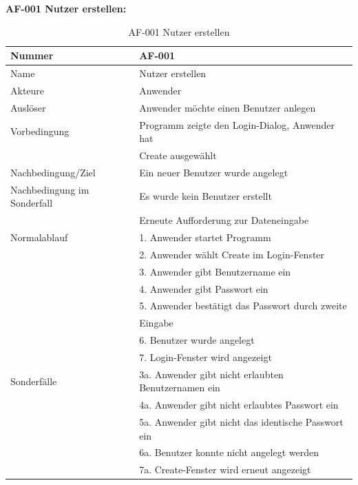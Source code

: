 \documentclass[12pt,a4paper,bibliography=totocnumbered,listof=totocnumbered]{scrartcl}
\begin{document}
\textbf{AF-001 Nutzer erstellen:}
\begin{table}[!h]
	\centering
	\begin{tabular}{|l|l|}
		\hline
		Nummer & AF-001\\
		\hline
		Name & Nutzer erstellen\\
		\hline
		Akteure & Anwender\\
		\hline
		Auslöser & Anwender möchte einen Benutzer anlegen\\
		\hline
		Vorbedingung & Programm zeigte den Login-Dialog, Anwender hat \\ &  Create ausgewählt\\
		\hline
		Nachbedingung/Ziel & Ein neuer Benutzer wurde angelegt \\
		\hline
		Nachbedingung im Sonderfall & Es wurde kein Benutzer erstellt \\ & Erneute Aufforderung zur Dateneingabe\\
		\hline
		Normalablauf & 1. Anwender startet Programm \\ & 2. Anwender wählt Create im Login-Fenster\\ & 3. Anwender gibt Benutzername ein \\ & 4. Anwender gibt Passwort ein \\ & 5. Anwender bestätigt das Passwort durch zweite\\ &Eingabe\\& 6. Benutzer wurde angelegt\\& 7. Login-Fenster wird angezeigt \\
		\hline
		Sonderfälle & 3a. Anwender gibt nicht erlaubten Benutzernamen ein \\ & 4a. Anwender gibt nicht erlaubtes Passwort ein \\& 5a. Anwender gibt nicht das identische Passwort ein\\& 6a. Benutzer konnte nicht angelegt werden \\& 7a. Create-Fenster wird erneut angezeigt\\
		\hline
	\end{tabular}
	\caption{AF-001 Nutzer erstellen}
	\label{tab:AF-001 Nutzer erstellen}
\end{table}
\pagebreak
\end{document}
